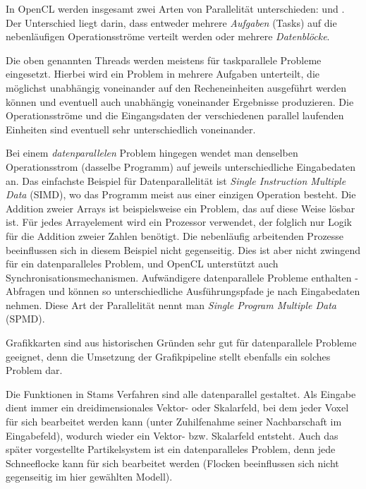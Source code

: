 In OpenCL werden insgesamt zwei Arten von Parallelität unterschieden:
 und
. Der Unterschied liegt darin, dass
entweder mehrere \emph{Aufgaben} (Tasks) auf die nebenläufigen
Operationsströme verteilt werden oder mehrere \emph{Datenblöcke}.

Die oben genannten Threads werden meistens für taskparallele Probleme
eingesetzt. Hierbei wird ein Problem in mehrere Aufgaben unterteilt,
die möglichst unabhängig voneinander auf den Recheneinheiten
ausgeführt werden können und eventuell auch unabhängig voneinander
Ergebnisse produzieren. Die Operationsströme und die Eingangsdaten der
verschiedenen parallel laufenden Einheiten sind eventuell sehr
unterschiedlich voneinander.

Bei einem \emph{datenparallelen} Problem hingegen wendet man denselben
Operationsstrom (dasselbe Programm) auf jeweils unterschiedliche
Eingabedaten an. Das einfachste Beispiel für Datenparallelität ist
\emph{Single Instruction Multiple Data} (SIMD), wo das Programm meist aus
einer einzigen Operation besteht. Die Addition zweier Arrays ist
beispielsweise ein Problem, das auf diese Weise lösbar ist. Für jedes
Arrayelement wird ein Prozessor verwendet, der folglich nur Logik für
die Addition zweier Zahlen benötigt. Die nebenläufig arbeitenden
Prozesse beeinflussen sich in diesem Beispiel nicht gegenseitig. Dies
ist aber nicht zwingend für ein datenparalleles Problem, und OpenCL
unterstützt auch Synchronisationsmechanismen. Aufwändigere
datenparallele Probleme enthalten -Abfragen und
können so unterschiedliche Ausführungspfade je nach Eingabedaten
nehmen. Diese Art der Parallelität nennt man \emph{Single Program
Multiple Data} (SPMD)\cite{Mattson:2004:PPP:1406956}.

Grafikkarten sind aus historischen Gründen sehr gut für datenparallele
Probleme geeignet, denn die Umsetzung der Grafikpipeline stellt
ebenfalls ein solches Problem dar.

Die Funktionen in Stams Verfahren sind alle datenparallel
gestaltet. Als Eingabe dient immer ein dreidimensionales Vektor- oder
Skalarfeld, bei dem jeder Voxel für sich bearbeitet werden kann (unter
Zuhilfenahme seiner Nachbarschaft im Eingabefeld), wodurch wieder ein
Vektor- bzw. Skalarfeld entsteht. Auch das später vorgestellte
Partikelsystem ist ein datenparalleles Problem, denn jede Schneeflocke
kann für sich bearbeitet werden (Flocken beeinflussen sich nicht
gegenseitig im hier gewählten Modell).

